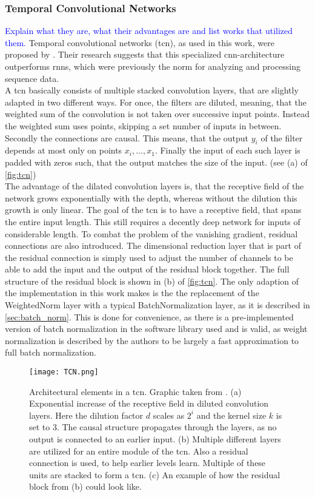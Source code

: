 \subsubsection{Temporal Convolutional Networks}
\textcolor{blue}{Explain what they are, what their advantages are and list works that utilized them.}
Temporal convolutional networks (\gls{tcn}), as used in this work, were proposed by \cite{tcn_paper}. Their research suggests that this specialized \gls{cnn}-architecture outperforms \gls{rnns}, which were previously the norm for analyzing and processing sequence data.\\
A \gls{tcn} basically consists of multiple stacked convolution layers, that are slightly adapted in two different ways. For once, the filters are diluted, meaning, that the weighted sum of the convolution is not taken over successive input points. Instead the weighted sum uses points, skipping a set number of inputs in between. Secondly the connections are causal. This means, that the output $y_i$ of the filter depends at most only on points $x_i, \dotsc,x_1$. Finally the input of each such layer is padded with zeros such, that the output matches the size of the input. (see (a) of \autoref{fig:tcn})\\
The advantage of the dilated convolution layers is, that the receptive field of the network grows exponentially with the depth, whereas without the dilution this growth is only linear. The goal of the \gls{tcn} is to have a receptive field, that spans the entire input length. This still requires a decently deep network for inputs of considerable length. To combat the problem of the vanishing gradient, residual connections are also introduced. The dimensional reduction layer that is part of the residual connection is simply used to adjust the number of channels to be able to add the input and the output of the residual block together. The full structure of the residual block is shown in (b) of \autoref{fig:tcn}. The only adaption of the implementation in this work makes is the the replacement of the WeightedNorm layer with a typical BatchNormalization layer, as it is described in \autoref{sec:batch_norm}. This is done for convenience, as there is a pre-implemented version of batch normalization in the software library used and is valid, as weight normalization is described by the authors to be largely a fast approximation to full batch normalization. \cite{weigth_norm_invention}
\begin{figure}
\centering
\texttt{[image: TCN.png]}
\caption[TCN structure]{Architectural elements in a \gls{tcn}. Graphic taken from \cite{tcn_paper}. (a) Exponential increase of the receptive field in diluted convolution layers. Here the dilution factor $d$ scales as $2^i$ and the kernel size $k$ is set to $3$. The causal structure propagates through the layers, as no output is connected to an earlier input. (b) Multiple different layers are utilized for an entire module of the \gls{tcn}. Also a residual connection is used, to help earlier levels learn. Multiple of these units are stacked to form a \gls{tcn}. (c) An example of how the residual block from (b) could look like.}\label{fig:tcn}
\end{figure}



